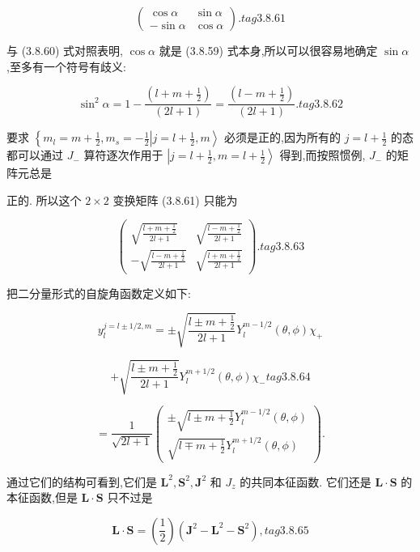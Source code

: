 $$
\left( \begin{matrix} \cos \alpha & \sin \alpha \\ - \sin \alpha & \cos \alpha \end{matrix}\right) . tag{3.8.61}
$$

与 (3.8.60) 式对照表明, $\cos \alpha$ 就是 (3.8.59) 式本身,所以可以很容易地确定 $\sin \alpha$ ,至多有一个符号有歧义:

$$
{\sin }^{2}\alpha = 1 - \frac{\left( l + m + \frac{1}{2}\right) }{\left( 2l + 1\right) } = \frac{\left( l - m + \frac{1}{2}\right) }{\left( 2l + 1\right) }. tag{3.8.62}
$$

要求 $\left\{ {{m}_{l} = m + \frac{1}{2},{m}_{s} = - \frac{1}{2}\left| {j = l + \frac{1}{2}, m}\right\rangle }\right.$ 必须是正的,因为所有的 $j = l + \frac{1}{2}$ 的态都可以通过 ${J}_{ - }$ 算符逐次作用于 $\left| {j = l + \frac{1}{2}, m = l + \frac{1}{2}}\right\rangle$ 得到,而按照惯例, ${J}_{ - }$ 的矩阵元总是

正的. 所以这个 $2 \times 2$ 变换矩阵 (3.8.61) 只能为

$$
\left( \begin{array}{ll} \sqrt{\frac{l + m + \frac{1}{2}}{{2l} + 1}} & \sqrt{\frac{l - m + \frac{1}{2}}{{2l} + 1}} \\ - \sqrt{\frac{l - m + \frac{1}{2}}{{2l} + 1}} & \sqrt{\frac{l + m + \frac{1}{2}}{{2l} + 1}} \end{array}\right) . tag{3. 8.63}
$$

把二分量形式的自旋角函数定义如下:

$$
{y}_{l}^{j = l \pm 1/2, m} = \pm \sqrt{\frac{l \pm m + \frac{1}{2}}{{2l} + 1}}{Y}_{l}^{m - 1/2}\left( {\theta ,\phi }\right) {\chi }_{ + }
$$

$$
+ \sqrt{\frac{l \pm m + \frac{1}{2}}{{2l} + 1}}{Y}_{l}^{m + 1/2}\left( {\theta ,\phi }\right) {\chi }_{ - } tag{3.8.64}
$$

$$
= \frac{1}{\sqrt{{2l} + 1}}\left( \begin{array}{l} \pm \sqrt{l \pm m + \frac{1}{2}}{Y}_{l}^{m - 1/2}\left( {\theta ,\phi }\right) \\ \sqrt{l \mp m + \frac{1}{2}}{Y}_{l}^{m + 1/2}\left( {\theta ,\phi }\right) \end{array}\right) .
$$

通过它们的结构可看到,它们是 ${\mathbf{L}}^{2},{\mathbf{S}}^{2},{\mathbf{J}}^{2}$ 和 ${J}_{z}$ 的共同本征函数. 它们还是 $\mathbf{L} \cdot \mathbf{S}$ 的本征函数,但是 $\mathbf{L} \cdot \mathbf{S}$ 只不过是

$$
\mathbf{L} \cdot \mathbf{S} = \left( \frac{1}{2}\right) \left( {{\mathbf{J}}^{2} - {\mathbf{L}}^{2} - {\mathbf{S}}^{2}}\right) , tag{3. 8.65}
$$

